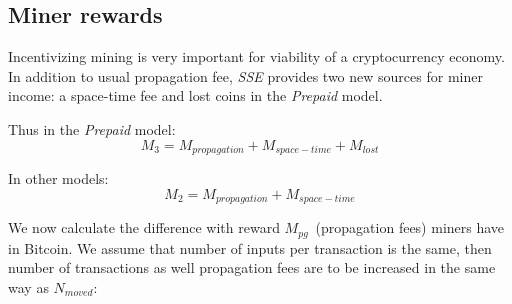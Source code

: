 \documentclass[]{llncs}   %
\newcommand{\esse}{\textit{SSE}}
\newcommand{\ignore}[1]{} %
\begin{document}
\ignore{
  and share of coins moved in a block:

  \begin{equation}
    M_{flow} \approx { N_{transactions} \cdot V_{output} \over N_{coins}} = {K \cdot B \over f_p}
  \end{equation}

  Thus, money flow may be controlled with \textit{K} parameter. This formula provide a way to estimate \textit{K} based on current Bitcoin statistics:

  \begin{equation}
    K={M_{flow} \cdot f_p \over B} \approx {10^{-9}} ({BTC / (Byte \cdot Block)})
  \end{equation}

  For a mean output size of 36 Bytes space-time fee part will exceed propagation fee after 5555 blocks or 38 days. 

  From money flow analysis we can find out how to use \esse{} model to control cryptocurrency money flow, changing space-time price and encourage active economy participants. Another money flow analysis result is the dependency between $L$ and $K$ \ref{eq:ltmean} that can particularly by used in the \textit{Scheduled payments} model to reduce number of model parameters.
}




\subsection{Miner rewards}
\label{minerrew}
Incentivizing mining is very important for viability of a cryptocurrency economy. 
In addition to usual propagation fee, \esse{} provides two new sources for miner income: a space-time fee and lost coins in the \textit{Prepaid} model.

Thus in the \textit{Prepaid} model:
\begin{equation}
M_{3} = M_{propagation} + M_{space-time} + M_{lost}
\end{equation}

In other models:
\begin{equation}
M_{2} = M_{propagation} + M_{space-time}
\end{equation}

We now calculate the difference with reward $M_{pg}$~(propagation fees) miners have in Bitcoin. We assume that number of inputs per transaction is the same, then number of transactions as well propagation fees are to be increased in the same way as $N_{moved}$:
\end{document}

